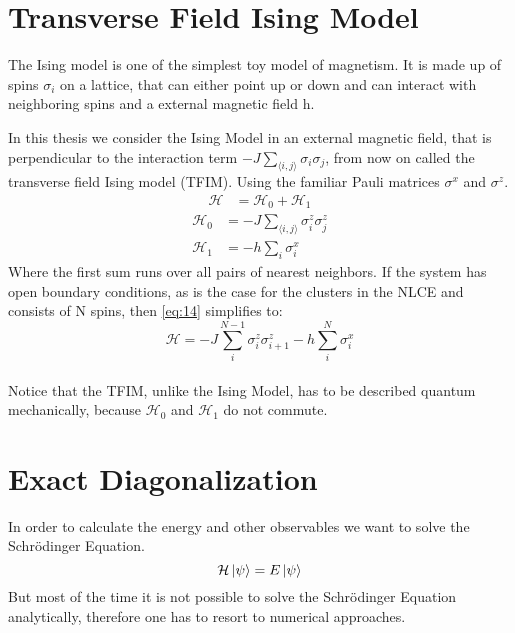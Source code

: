 \documentclass[a4paper,12pt]{article}
\begin{document}
\newpage


\section{Transverse Field Ising Model}

The Ising model is one of the simplest toy model of magnetism. It is
made up of spins $\sigma_i$ on a lattice, that can either point up or
down and can interact with neighboring spins and a external magnetic
field h.

In this thesis we consider the Ising Model in an external magnetic
field, that is perpendicular to the interaction term $-J \sum_{\langle
i,j \rangle} \sigma_i \sigma_j$, from now on called the transverse
field Ising model (TFIM). Using the familiar Pauli matrices $\sigma^x$ and $\sigma^z$.
\begin{align}
\label{eq:14}
\mathcal{H} &= \mathcal{H}_0 + \mathcal{H}_1
\end{align}
\begin{align}
\label{eq:24}
\mathcal{H}_0 &= -J \sum\limits_{\langle i,j \rangle} \sigma_i^z \sigma_j ^z\\
\mathcal{H}_1 &= - h \sum\limits_i \sigma_i^x
\end{align}
Where the first sum runs over all pairs of nearest neighbors. If the
system has open boundary conditions, as is the case for the clusters
in the NLCE and consists of N spins, then
\eqref{eq:14} simplifies to:
\begin{equation}
\label{eq:19}
\mathcal{H} = -J \sum\limits_i^{N-1} \sigma_i^z \sigma_{i+1} ^z- h
\sum\limits_i^N \sigma_i^x
\end{equation}
\\
Notice that the TFIM, unlike the Ising Model, has to be described
quantum mechanically, because $\mathcal{H}_0$ and $\mathcal{H}_1$ do
not commute.

\section{Exact Diagonalization}

In order to calculate the energy and other observables we want to solve the Schr\"odinger Equation.
\begin{equation}
\label{eq:1}
\mathcal{H} \ket{\psi} = E \ket{\psi}
\end{equation}
But most of the time it is not possible to solve the Schr\"odinger
Equation analytically, therefore one has to resort to numerical
approaches.
\end{document}

